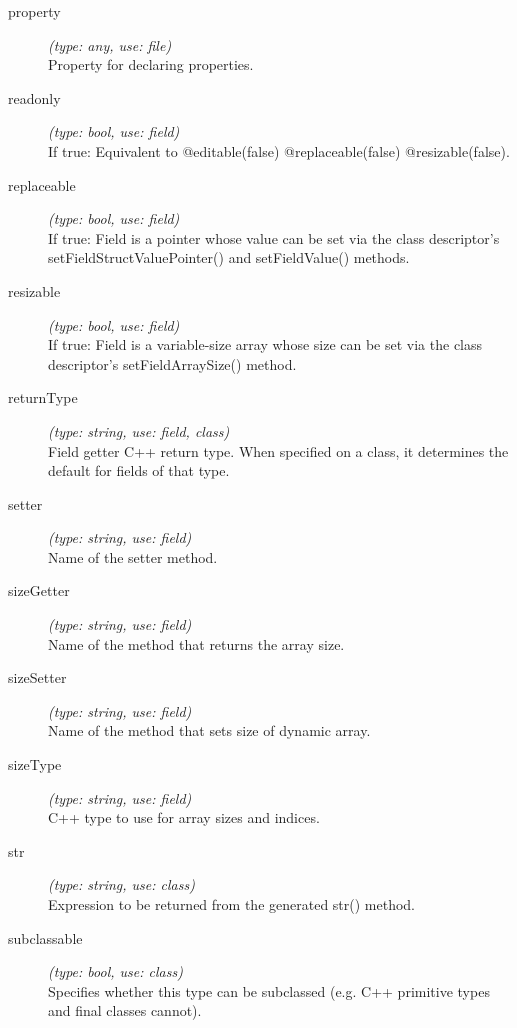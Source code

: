 \begin{description}
\item[property] \textit{(type: any, use: file)} \\
  Property for declaring properties.

\item[readonly] \textit{(type: bool, use: field)} \\
  If true: Equivalent to @editable(false) @replaceable(false)
  @resizable(false).

\item[replaceable] \textit{(type: bool, use: field)} \\
  If true: Field is a pointer whose value can be set via the class
  descriptor's setFieldStructValuePointer() and setFieldValue() methods.

\item[resizable] \textit{(type: bool, use: field)} \\
  If true: Field is a variable-size array whose size can be set via the class
  descriptor's setFieldArraySize() method.

\item[returnType] \textit{(type: string, use: field, class)} \\
  Field getter C++ return type. When specified on a class, it determines the
  default for fields of that type.

\item[setter] \textit{(type: string, use: field)} \\
  Name of the setter method.

\item[sizeGetter] \textit{(type: string, use: field)} \\
  Name of the method that returns the array size.

\item[sizeSetter] \textit{(type: string, use: field)} \\
  Name of the method that sets size of dynamic array.

\item[sizeType] \textit{(type: string, use: field)} \\
  C++ type to use for array sizes and indices.

\item[str] \textit{(type: string, use: class)} \\
  Expression to be returned from the generated str() method.

\item[subclassable] \textit{(type: bool, use: class)} \\
  Specifies whether this type can be subclassed (e.g. C++ primitive types and
  final classes cannot).


\end{description}
